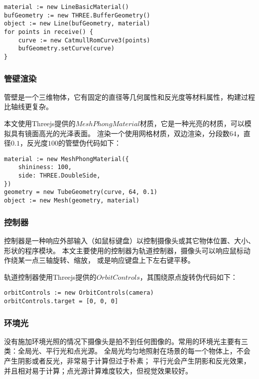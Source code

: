 \begin{lstlisting}[caption={渲染轴线}]
material := new LineBasicMaterial()
bufGeometry := new THREE.BufferGeometry()
object := new Line(bufGeometry, material)
for points in receive() {
    curve := new CatmullRomCurve3(points)
    bufGeometry.setCurve(curve)
}
\end{lstlisting}

\subsubsection{管壁渲染}

管壁是一个三维物体，它有固定的直径等几何属性和反光度等材料属性，构建过程比轴线更复杂。

本文使用Threejs提供的$MeshPhongMaterial$材质，它是一种光亮的材质，可以模拟具有镜面高光的光泽表面。
渲染一个使用网格材质，双边渲染，分段数$64$，直径$0.1$，反光度$100$的管壁伪代码如下：

\begin{lstlisting}[caption={渲染管壁}]
material := new MeshPhongMaterial({
    shininess: 100,
    side: THREE.DoubleSide,
})
geometry = new TubeGeometry(curve, 64, 0.1)
object := new Mesh(geometry, material)
\end{lstlisting}

\subsubsection{控制器}
控制器是一种响应外部输入（如鼠标键盘）以控制摄像头或其它物体位置、大小、形状的程序模块。
本文主要使用的控制器为轨道控制器，摄像头可以响应鼠标动作绕某一点三轴旋转、缩放，
或是响应键盘上下左右键平移。

轨道控制器使用Threejs提供的$OrbitControls$，其围绕原点旋转伪代码如下：

\begin{lstlisting}[caption={轨道控制器}]
orbitControls := new OrbitControls(camera)
orbitControls.target = [0, 0, 0]
\end{lstlisting}

\subsubsection{环境光}

没有施加环境光照的情况下摄像头是拍不到任何图像的。常用的环境光主要有三类：全局光、平行光和点光源。
全局光均匀地照射在场景的每一个物体上，不会产生阴影或者反光，非常易于计算但过于朴素；
平行光会产生阴影和反光效果，并且相对易于计算；点光源计算难度较大，但视觉效果较好。

